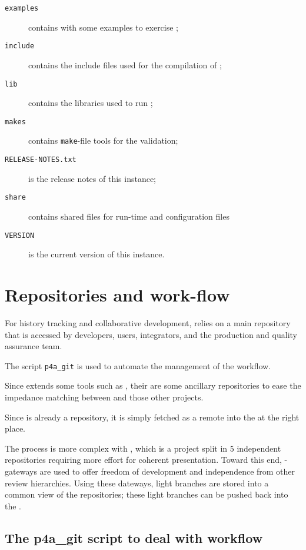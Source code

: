 \documentclass[a4paper]{article}
\begin{document}
\begin{description}
\begin{description}
  \item[\texttt{examples}] contains with some examples to exercise \Apfa;
  \item[\texttt{include}] contains the include files used for the
    compilation of \Apfa;
  \item[\texttt{lib}] contains the libraries used to run \Apfa;
  \item[\texttt{makes}] contains \texttt{make}-file tools for the
    \Apips validation;
  \item[\texttt{RELEASE-NOTES.txt}] is the release notes of this \Apfa
    instance;
  \item[\texttt{share}] contains shared files for run-time and
    configuration files
  \item[\texttt{VERSION}] is the current version of this \Apfa
    instance.
  \end{description}
\end{description}


\section{Repositories and work-flow}
\label{sec:repos-workfl}

For history tracking and collaborative development, \Apfa relies on a main
\Agit repository that is accessed by \Apfa developers, users, integrators,
and the production and quality assurance team.

The script \verb|p4a_git| is used to automate the management of the
workflow.

Since \Apfa extends some tools such as \Apips, their are some
ancillary repositories to ease the impedance matching between \Apfa and
those other projects.

Since \Apolylib is already a \Agit repository, it is simply fetched as a
remote \Agit into the \Apfa at the right place.

The process is more complex with \Apips, which is a project split in 5
independent \Asvn repositories requiring more effort for coherent presentation.
Toward this end, \Asvn-\Agit gateways are used to offer freedom of
development and independence from other review hierarchies. Using
these dateways, light
branches are stored into a common \Agit view of the \Apips{} \Asvn
repositories; these light branches can be pushed back into the \Apips{} \Asvn.

\subsection{The p4a\_git script to deal with workflow}
\label{sec:p4a_git-script-deal}
\end{document}
